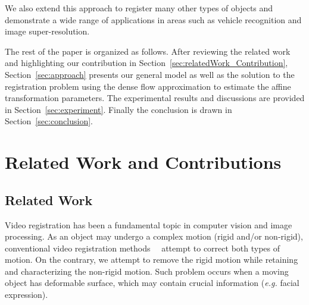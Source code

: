 \documentclass[10pt,journal]{IEEEtran}
\begin{document}
We also extend this approach to register many other types of objects and demonstrate a wide range of applications in areas such as vehicle recognition and image super-resolution. 

The rest of the paper is organized as follows. After reviewing the related work and highlighting our contribution in Section~\ref{sec:relatedWork_Contribution}, Section~\ref{sec:approach} presents our general model as well as the solution to the registration problem using the dense flow approximation to estimate the affine transformation parameters. The experimental results and discussions are provided in Section~\ref{sec:experiment}. Finally the conclusion is drawn in Section~\ref{sec:conclusion}.


\section{\label{sec:relatedWork_Contribution}Related Work and Contributions}

\subsection{\label{sec:related_work}Related Work}

Video registration has been a fundamental topic in computer vision and image processing. As an object may undergo a complex motion (rigid and/or non-rigid), conventional video registration methods~\cite{Uenohara95}~\cite{Caspi_PAMI02} attempt to correct both types of motion. On the contrary, we attempt to remove the rigid motion while retaining and characterizing the non-rigid motion. Such problem occurs when a moving object has deformable surface, which may contain crucial information (\textit{e.g.} facial expression).
\end{document}
